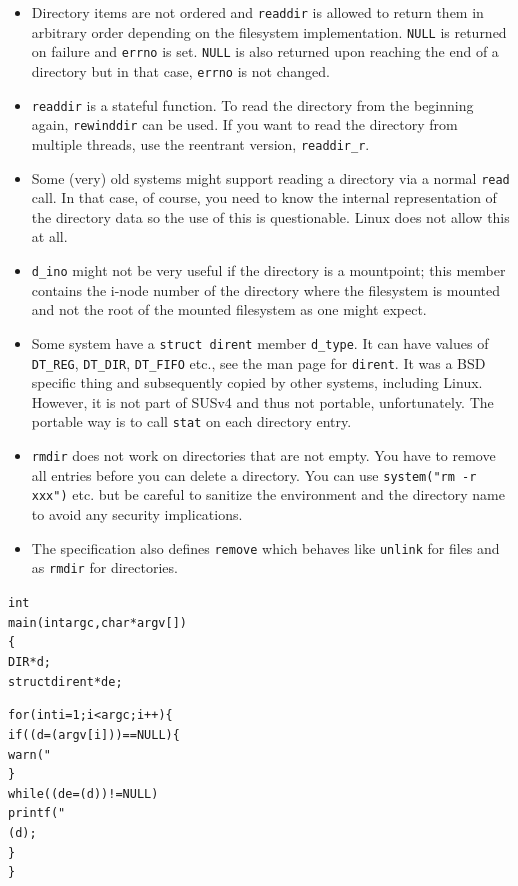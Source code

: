\begin{itemize}
\item Directory items are not ordered and
\texttt{readdir} is allowed to return them in arbitrary order depending on the
filesystem implementation.  \texttt{NULL} is returned on failure
and \texttt{errno} is set.  \texttt{NULL} is also returned upon reaching the end
of a directory but in that case, \texttt{errno} is not changed.
\item \texttt{readdir} is a stateful function.  To read the directory from the
beginning again, \texttt{rewinddir} can be used.  If you want to read the
directory from multiple threads, use the reentrant version, \texttt{readdir\_r}.
\item Some (very) old systems might support reading a directory via a normal
\texttt{read} call.  In that case, of course, you need to know the internal
representation of the directory data so the use of this is questionable.  Linux
does not allow this at all.
\item \texttt{d\_ino} might not be very useful if the directory is a
mountpoint; this member contains the i-node number of the directory where the
filesystem is mounted and not the root of the mounted filesystem as one might
expect.
\item \label{D_TYPE} Some system have a \texttt{struct dirent} member
\texttt{d\_type}.  It can have values of \texttt{DT\_REG}, \texttt{DT\_DIR},
\texttt{DT\_FIFO} etc., see the man page for \texttt{dirent}.  It was a BSD
specific thing and subsequently copied by other systems, including Linux.
However, it is not part of SUSv4 and thus not portable, unfortunately.
The portable way is to call \texttt{stat} on each directory entry.
\item \texttt{rmdir} does not work on directories that are not empty.  You have
to remove all entries before you can delete a directory.  You can use
\texttt{system("rm -r xxx")} etc. but be careful to sanitize the environment and
the directory name to avoid any security implications.
\item \label{REMOVE} The specification also defines \texttt{remove} which
behaves like \texttt{unlink} for files and as \texttt{rmdir} for directories.
\end{itemize}


\begin{slide}
\begin{alltt}
int
main(int argc, char *argv[])
\{
    DIR *d;
    struct dirent *de;

    for (int i = 1; i < argc; i++) \{
        if ((d = (argv[i])) == NULL) \{
                warn("%
        \}
        while ((de = (d)) != NULL)
            printf("%
        (d);
    \}
\}
\end{alltt}
\end{slide}

